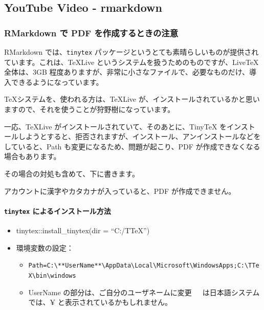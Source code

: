 \documentclass[
]{bxjsbook}
\providecommand{\tightlist}{%
  \setlength{\itemsep}{0pt}\setlength{\parskip}{0pt}}
\theoremstyle{definition}
\theoremstyle{definition}
\theoremstyle{definition}
\theoremstyle{definition}
\theoremstyle{remark}
\begin{document}
\hypertarget{youtube-video---rmarkdown}{%
\subsection{YouTube Video - rmarkdown}\label{youtube-video---rmarkdown}}

\hypertarget{rmarkdown-ux3067-pdf-ux3092ux4f5cux6210ux3059ux308bux3068ux304dux306eux6ce8ux610f}{%
\subsubsection{RMarkdown で PDF を作成するときの注意}\label{rmarkdown-ux3067-pdf-ux3092ux4f5cux6210ux3059ux308bux3068ux304dux306eux6ce8ux610f}}

RMarkdown では、\texttt{tinytex} パッケージというとても素晴らしいものが提供されています。これは、TeXLive というシステムを扱うためのものですが、LiveTeX 全体は、3GB 程度ありますが、非常に小さなファイルで、必要なものだけ、導入できるようになっています。

\TeX システムを、使われる方は、TeXLive が、インストールされているかと思いますので、それを使うことが狩野樹になっています。

一応、TeXLive がインストールされていて、そのあとに、TinyTeX をインストールしようとすると、拒否されますが、インストール、アンインストールなどをしていると、Path も変更になるため、問題が起こり、PDF が作成できなくなる場合もあります。

その場合の対処も含めて、下に書きます。

アカウントに漢字やカタカナが入っていると、PDF が作成できません。

\hypertarget{tinytex-ux306bux3088ux308bux30a4ux30f3ux30b9ux30c8ux30fcux30ebux65b9ux6cd5}{%
\paragraph{\texorpdfstring{\texttt{tinytex} によるインストール方法}{tinytex によるインストール方法}}\label{tinytex-ux306bux3088ux308bux30a4ux30f3ux30b9ux30c8ux30fcux30ebux65b9ux6cd5}}

\begin{itemize}
\tightlist
\item
  tinytex::install\_tinytex(dir = ``C:/TTeX'')
\item
  環境変数の設定：

  \begin{itemize}
  \tightlist
  \item
    \texttt{Path=C:\textbackslash{}**UserName**\textbackslash{}AppData\textbackslash{}Local\textbackslash{}Microsoft\textbackslash{}WindowsApps;C:\textbackslash{}TTeX\textbackslash{}bin\textbackslash{}windows}
  \item
    UserName の部分は、ご自分のユーザネームに変更　~は日本語システムでは、¥ と表示されているかもしれません。
  \end{itemize}
\end{itemize}
\end{document}
